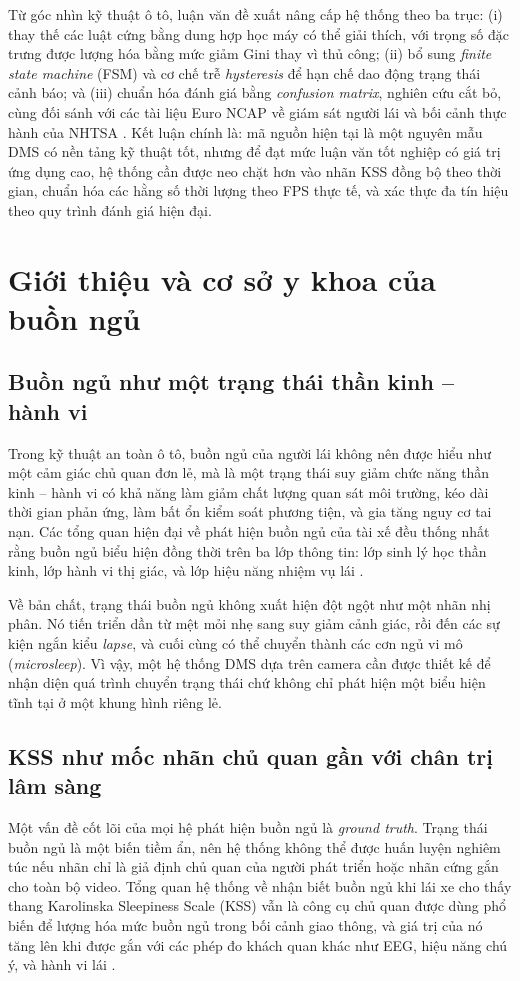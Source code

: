 \documentclass[12pt,a4paper]{article}
\begin{document}
Từ góc nhìn kỹ thuật ô tô, luận văn đề xuất nâng cấp hệ thống theo ba trục: (i) thay thế các luật cứng bằng dung hợp học máy có thể giải thích, với trọng số đặc trưng được lượng hóa bằng mức giảm Gini thay vì  thủ công; (ii) bổ sung \textit{finite state machine} (FSM) và cơ chế trễ \textit{hysteresis} để hạn chế dao động trạng thái cảnh báo; và (iii) chuẩn hóa đánh giá bằng \textit{confusion matrix}, nghiên cứu cắt bỏ, cùng đối sánh với các tài liệu Euro NCAP về giám sát người lái và bối cảnh thực hành của NHTSA \cite{euroncap_driver_engagement,euroncapsd201,euroncapsd202}. Kết luận chính là: mã nguồn hiện tại là một nguyên mẫu DMS có nền tảng kỹ thuật tốt, nhưng để đạt mức luận văn tốt nghiệp có giá trị ứng dụng cao, hệ thống cần được neo chặt hơn vào nhãn KSS đồng bộ theo thời gian, chuẩn hóa các hằng số thời lượng theo FPS thực tế, và xác thực đa tín hiệu theo quy trình đánh giá hiện đại.

\newpage
\section{Giới thiệu và cơ sở y khoa của buồn ngủ}
\subsection{Buồn ngủ như một trạng thái thần kinh -- hành vi}
Trong kỹ thuật an toàn ô tô, buồn ngủ của người lái không nên được hiểu như một cảm giác chủ quan đơn lẻ, mà là một trạng thái suy giảm chức năng thần kinh -- hành vi có khả năng làm giảm chất lượng quan sát môi trường, kéo dài thời gian phản ứng, làm bất ổn kiểm soát phương tiện, và gia tăng nguy cơ tai nạn. Các tổng quan hiện đại về phát hiện buồn ngủ của tài xế đều thống nhất rằng buồn ngủ biểu hiện đồng thời trên ba lớp thông tin: lớp sinh lý học thần kinh, lớp hành vi thị giác, và lớp hiệu năng nhiệm vụ lái \cite{hussein2023,review2022}.

Về bản chất, trạng thái buồn ngủ không xuất hiện đột ngột như một nhãn nhị phân. Nó tiến triển dần từ mệt mỏi nhẹ sang suy giảm cảnh giác, rồi đến các sự kiện ngắn kiểu \textit{lapse}, và cuối cùng có thể chuyển thành các cơn ngủ vi mô (\textit{microsleep}). Vì vậy, một hệ thống DMS dựa trên camera cần được thiết kế để nhận diện quá trình chuyển trạng thái chứ không chỉ phát hiện một biểu hiện tĩnh tại ở một khung hình riêng lẻ.

\subsection{KSS như mốc nhãn chủ quan gần với chân trị lâm sàng}
Một vấn đề cốt lõi của mọi hệ phát hiện buồn ngủ là \textit{ground truth}. Trạng thái buồn ngủ là một biến tiềm ẩn, nên hệ thống không thể được huấn luyện nghiêm túc nếu nhãn chỉ là giả định chủ quan của người phát triển hoặc nhãn cứng gắn cho toàn bộ video. Tổng quan hệ thống về nhận biết buồn ngủ khi lái xe cho thấy thang Karolinska Sleepiness Scale (KSS) vẫn là công cụ chủ quan được dùng phổ biến để lượng hóa mức buồn ngủ trong bối cảnh giao thông, và giá trị của nó tăng lên khi được gắn với các phép đo khách quan khác như EEG, hiệu năng chú ý, và hành vi lái \cite{awareness2021,hussein2023}.
\end{document}
